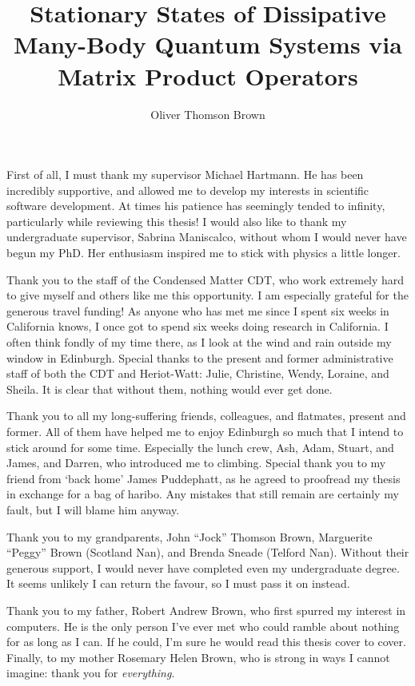\documentclass[a4paper,oneside,12pt]{hwthesis}
\author{Oliver Thomson Brown}
\title{Stationary States of Dissipative Many-Body Quantum Systems via Matrix Product Operators}
\newcommand*{\chappath}{../../include/chapters}
\begin{document}
\maketitle


\begin{abstract}

\end{abstract}

\begin{acknowledgements}
First of all, I must thank my supervisor Michael Hartmann. He has been incredibly supportive, and allowed me to develop my interests in scientific software development. At times his patience has seemingly tended to infinity, particularly while reviewing this thesis! I would also like to thank my undergraduate supervisor, Sabrina Maniscalco, without whom I would never have begun my PhD. Her enthusiasm inspired me to stick with physics a little longer.

Thank you to the staff of the Condensed Matter CDT, who work extremely hard to give myself and others like me this opportunity. I am especially grateful for the generous travel funding! As anyone who has met me since I spent six weeks in California knows, I once got to spend six weeks doing research in California. I often think fondly of my time there, as I look at the wind and rain outside my window in Edinburgh. Special thanks to the present and former administrative staff of both the CDT and Heriot-Watt: Julie, Christine, Wendy, Loraine, and Sheila. It is clear that without them, nothing would ever get done.

Thank you to all my long-suffering friends, colleagues, and flatmates, present and former. All of them have helped me to enjoy Edinburgh so much that I intend to stick around for some time. Especially the lunch crew, Ash, Adam, Stuart, and James, and Darren, who introduced me to climbing. Special thank you to my friend from `back home' James Puddephatt, as he agreed to proofread my thesis in exchange for a bag of haribo. Any mistakes that still remain are certainly my fault, but I will blame him anyway.

Thank you to my grandparents, John ``Jock'' Thomson Brown, Marguerite ``Peggy'' Brown (Scotland Nan), and Brenda Sneade (Telford Nan). Without their generous support, I would never have completed even my undergraduate degree. It seems unlikely I can return the favour, so I must pass it on instead.   

Thank you to my father, Robert Andrew Brown, who first spurred my interest in computers. He is the only person I've ever met who could ramble about nothing for as long as I can. If he could, I'm sure he would read this thesis cover to cover. Finally, to my mother Rosemary Helen Brown, who is strong in ways I cannot imagine: thank you for \emph{everything}.
\end{acknowledgements}
\end{document}
